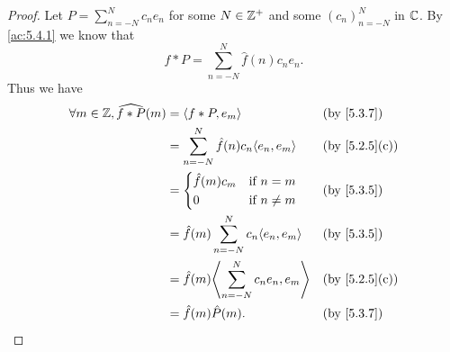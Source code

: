 \begin{proof}
  Let \(P = \sum_{n = -N}^N c_n e_n\) for some \(N \in \mathbb{Z}^+\) and some \((c_n)_{n = -N}^N\) in \(\mathbb{C}\).
  By \cref{ac:5.4.1} we know that
  \[
    f * P = \sum_{n = -N}^N \hat{f}(n) c_n e_n.
  \]
  Thus we have
  \begin{align*}
    \forall m \in \Z, \widehat{f * P}(m) & = \inner{f * P, e_m}                               &  & \by{5.3.7}                  \\
                                         & = \sum_{n = -N}^N \hat{f}(n) c_n \inner{e_n, e_m}  &  & \text{(by \cref{5.2.5}(c))} \\
                                         & = \begin{dcases}
                                               \hat{f}(m) c_m & \text{if } n = m    \\
                                               0              & \text{if } n \neq m
                                             \end{dcases}            &  & \by{5.3.5}                                           \\
                                         & = \hat{f}(m) \sum_{n = -N}^N c_n \inner*{e_n, e_m} &  & \by{5.3.5}                  \\
                                         & = \hat{f}(m) \inner*{\sum_{n = -N}^N c_n e_n, e_m} &  & \text{(by \cref{5.2.5}(c))} \\
                                         & = \hat{f}(m) \hat{P}(m).                           &  & \by{5.3.7}
  \end{align*}


\end{proof}
